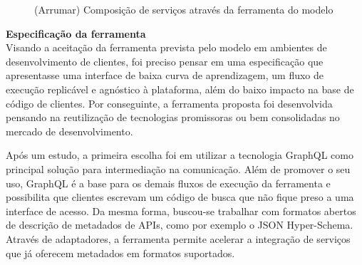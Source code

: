 \begin{figure}[H]
  \centering
  \caption{(Arrumar) Composição de serviços através da ferramenta do modelo}
\end{figure}

\textbf{Especificação da ferramenta} \\

Visando a aceitação da ferramenta prevista pelo modelo em ambientes de desenvolvimento de clientes, foi preciso pensar em uma especificação que apresentasse uma interface de baixa curva de aprendizagem, um fluxo de execução replicável e agnóstico à plataforma, além do baixo impacto na base de código de clientes. Por conseguinte, a ferramenta proposta foi desenvolvida pensando na reutilização de tecnologias promissoras ou bem consolidadas no mercado de desenvolvimento.

Após um estudo, a primeira escolha foi em utilizar a tecnologia GraphQL como principal solução para intermediação na comunicação. Além de promover o seu uso, GraphQL é a base para os demais fluxos de execução da ferramenta e possibilita que clientes escrevam um código de busca que não fique preso a uma interface de acesso. Da mesma forma, buscou-se trabalhar com formatos abertos de descrição de metadados de APIs, como por exemplo o JSON Hyper-Schema. Através de adaptadores, a ferramenta permite acelerar a integração de serviços que já oferecem metadados em formatos suportados.

